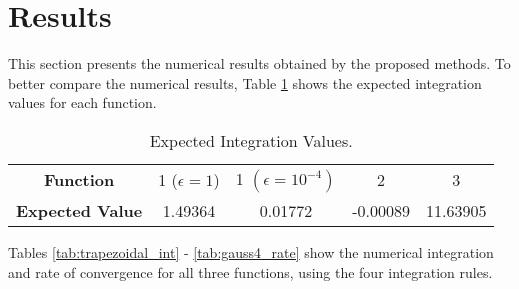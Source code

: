 \section{Results} \label{sec:results}
This section presents the numerical results obtained by the proposed methods. To better compare the numerical results, Table \ref{tab:expected} shows the expected integration values for each function.
\begin{table}[H]
    \centering
    \caption{Expected Integration Values.}
    \label{tab:expected}
    \begin{tabular}{ccccc}
    \hline
    \textbf{Function}  & \makecell{1 \\ ($\epsilon = 1$)} & \makecell{1 \\ $\left(\epsilon = 10^{-4}\right)$} & 2 & 3 \\ 
    \textbf{Expected Value} & 1.49364 & 0.01772 & -0.00089 & 11.63905 \\ \hline
    \end{tabular}
\end{table}

Tables \ref{tab:trapezoidal_int} - \ref{tab:gauss4_rate} show the numerical integration and rate of convergence for all three functions, using the four integration rules. 



